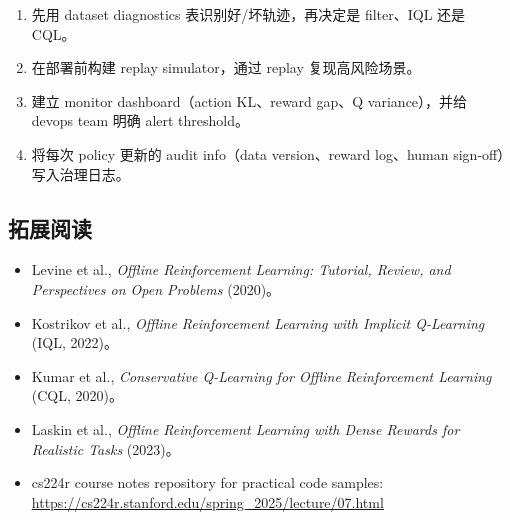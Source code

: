 \begin{enumerate}
    \item 先用 dataset diagnostics 表识别好/坏轨迹，再决定是 filter、IQL 还是 CQL。
    \item 在部署前构建 replay simulator，通过 replay 复现高风险场景。
    \item 建立 monitor dashboard（action KL、reward gap、Q variance），并给 devops team 明确 alert threshold。
    \item 将每次 policy 更新的 audit info（data version、reward log、human sign-off）写入治理日志。
\end{enumerate}

\subsection{拓展阅读}
\begin{itemize}
    \item Levine et al., \textit{Offline Reinforcement Learning: Tutorial, Review, and Perspectives on Open Problems} (2020)。
    \item Kostrikov et al., \textit{Offline Reinforcement Learning with Implicit Q-Learning} (IQL, 2022)。
    \item Kumar et al., \textit{Conservative Q-Learning for Offline Reinforcement Learning} (CQL, 2020)。
    \item Laskin et al., \textit{Offline Reinforcement Learning with Dense Rewards for Realistic Tasks} (2023)。
    \item cs224r course notes repository for practical code samples: \url{https://cs224r.stanford.edu/spring_2025/lecture/07.html}
\end{itemize}


